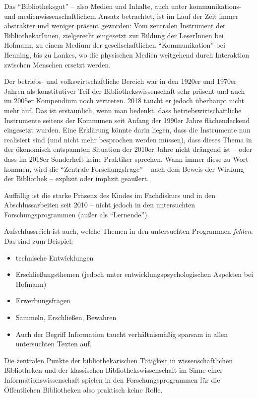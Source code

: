 \documentclass[a4paper,
fontsize=11pt,
oneside,
numbers=noperiodatend,
parskip=half-,
bibliography=totoc,
final
]{scrartcl}
\begin{document}
Das \enquote{Bibliotheksgut} -- also Medien und Inhalte, auch unter
kommunikations- und medienwissenschaftlichem Ansatz betrachtet, ist im
Lauf der Zeit immer abstrakter und weniger präsent geworden: Vom
zentralen Instrument der BibliothekarInnen, zielgerecht eingesetzt zur
Bildung der LeserInnen bei Hofmann, zu einem Medium der
gesellschaftlichen \enquote{Kommunikation} bei Henning, bis zu Lankes,
wo die physischen Medien weitgehend durch Interaktion zwischen Menschen
ersetzt werden.

Der betriebs- und volkswirtschaftliche Bereich war in den 1920er und
1970er Jahren als konstitutiver Teil der Bibliothekswissenschaft sehr
präsent und auch im 2005er Kompendium noch vertreten. 2018 taucht er
jedoch überhaupt nicht mehr auf. Das ist erstaunlich, wenn man bedenkt,
dass betriebswirtschaftliche Instrumente seitens der Kommunen seit
Anfang der 1990er Jahre flächendeckend eingesetzt wurden. Eine Erklärung
könnte darin liegen, dass die Instrumente nun realisiert sind (und nicht
mehr besprochen werden müssen), dass dieses Thema in der ökonomisch
entspannten Situation der 2010er Jahre nicht drängend ist -- oder dass
im 2018er Sonderheft keine Praktiker sprechen. Wann immer diese zu Wort
kommen, wird die \enquote{Zentrale Forschungsfrage} -- nach dem Beweis
der Wirkung der Bibliothek -- explizit oder implizit geäußert.

Auffällig ist die starke Präsenz des Kindes im Fachdiskurs und in den
Abschlussarbeiten seit 2010 -- nicht jedoch in den untersuchten
Forschungsprogrammen (außer als \enquote{Lernende}).

Aufschlussreich ist auch, welche Themen in den untersuchten Programmen
\emph{fehlen}. Das sind zum Beispiel:

\begin{itemize}
\item
  technische Entwicklungen
\item
  Erschließungsthemen (jedoch unter entwicklungspsychologischen Aspekten
  bei Hofmann)
\item
  Erwerbungsfragen
\item
  Sammeln, Erschließen, Bewahren
\item
  Auch der Begriff Information taucht verhältnismäßig sparsam in allen
  untersuchten Texten auf.
\end{itemize}

Die zentralen Punkte der bibliothekarischen Tätigkeit in
wissenschaftlichen Bibliotheken und der klassischen
Bibliothekswissenschaft im Sinne einer Informationswissenschaft spielen
in den Forschungsprogrammen für die Öffentlichen Bibliotheken also
praktisch keine Rolle.
\end{document}
